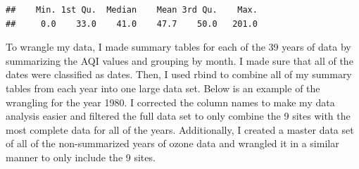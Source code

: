 \documentclass[12pt,]{article}
\begin{document}
\begin{verbatim}
##    Min. 1st Qu.  Median    Mean 3rd Qu.    Max. 
##     0.0    33.0    41.0    47.7    50.0   201.0
\end{verbatim}

To wrangle my data, I made summary tables for each of the 39 years of
data by summarizing the AQI values and grouping by month. I made sure
that all of the dates were classified as dates. Then, I used rbind to
combine all of my summary tables from each year into one large data set.
Below is an example of the wrangling for the year 1980. I corrected the
column names to make my data analysis easier and filtered the full data
set to only combine the 9 sites with the most complete data for all of
the years. Additionally, I created a master data set of all of the
non-summarized years of ozone data and wrangled it in a similar manner
to only include the 9 sites.
\end{document}
